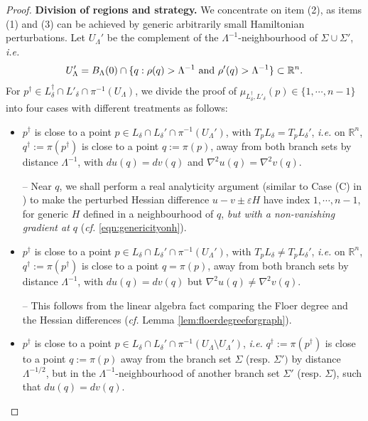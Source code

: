 \documentclass[11pt,a4paper]{article}
\numberwithin{equation}{section}%
\theoremstyle{definition}
\newcommand{\ie}{\emph{i.e.} }
\newcommand{\cf}{\emph{cf.} }
\newcommand{\R}{\mathbb{R}}
\begin{document}
\begin{proof}
   \textbf{Division of regions and strategy.} We concentrate on item (2), as items (1) and (3) can be achieved by generic arbitrarily small Hamiltonian perturbations.  Let $U_\Lambda'$ be the complement of the $\Lambda^{-1}$-neighbourhood of $\Sigma\cup \Sigma'$, \ie
   $$U_{\Lambda}'=B_\Lambda(0)\cap \{q:\rho(q)> \Lambda^{-1}~\textnormal{and}~\rho'(q)> \Lambda^{-1}\}\subset \R^n.$$ For $p^\dagger \in  L_\delta^{\dagger}\cap  L'_\delta\cap \pi^{-1}(U_\Lambda)$, we divide the proof of $\mu_{ L_\delta^{\dagger},  L'_\delta}(p) \in \{ 1,\cdots,n-1\}$ into four cases with different treatments as follows: 
   
   \begin{itemize}
       \item [(a)] $p^\dagger$ is close to a point $p\in L_{\delta}\cap  L_{\delta}'\cap \pi^{-1}(U_\Lambda')$, with $T_pL_{\delta}=T_pL_{\delta}'$, \ie on $\R^n$, $q^{\dagger}:=\pi(p^\dagger)$ is close to a point $q:=\pi(p)$, away from both branch sets by distance $\Lambda^{-1}$, with $du(q)=dv(q)$ and $\nabla^2u(q)=\nabla^2v(q)$. 
       
       -- Near $q$, we shall perform a real analyticity argument (similar to Case (C) in \cite[Lemma 4.19]{IJS}) to make the perturbed Hessian difference $u-v\pm \varepsilon H$ have index $1,\cdots,n-1$, for generic $H$ defined in a neighbourhood of $q$, \textit{but with a non-vanishing gradient at $q$} (\cf \eqref{eqn:genericityonh}).  

\item [(b)] $p^\dagger$ is close to a point $p\in L_{\delta}\cap  L_{\delta}'\cap \pi^{-1}(U_\Lambda')$, with $T_pL_{\delta}\neq T_pL_{\delta}'$, \ie on $\R^n$, $q^{\dagger}:=\pi(p^\dagger)$ is close to a point $q=\pi(p)$, away from both branch sets by distance $\Lambda^{-1}$, with $du(q)=dv(q)$ but $\nabla^2u(q)\neq \nabla^2v(q)$. 
       
       -- This follows from the linear algebra fact comparing the Floer degree and the Hessian differences (\cf Lemma \ref{lem:floerdegreeforgraph}). 
    
        \item [(c)] $p^\dagger$ is close to a point $p\in L_{\delta}\cap  L_{\delta}'\cap \pi^{-1}(U_\Lambda\setminus U_{\Lambda}')$, \ie $q^{\dagger}:=\pi (p^\dagger)$ is close to a point $q:=\pi(p)$ away from the branch set $\Sigma$ (resp. $\Sigma')$ by distance $\Lambda^{-1/2}$, but in the $\Lambda^{-1}$-neighbourhood of another branch set $\Sigma'$ (resp. $\Sigma$), such that $du(q)=dv(q)$.


\end{itemize}
\end{proof}
\end{document}
